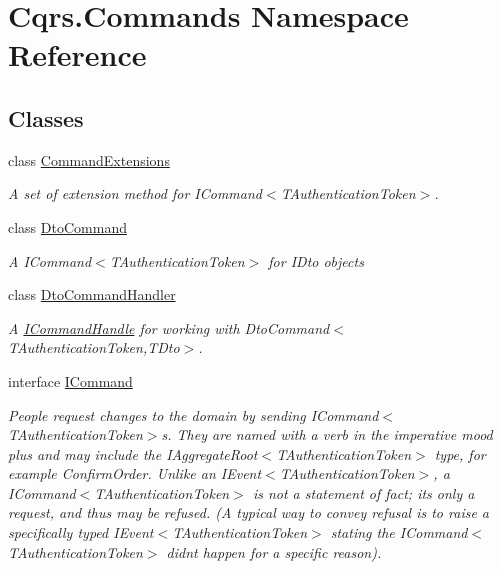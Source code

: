 \hypertarget{namespaceCqrs_1_1Commands}{}\section{Cqrs.\+Commands Namespace Reference}
\label{namespaceCqrs_1_1Commands}
\subsection*{Classes}
\begin{DoxyCompactItemize}
\item 
class \hyperlink{classCqrs_1_1Commands_1_1CommandExtensions}{Command\+Extensions}
\begin{DoxyCompactList}\small\item\em A set of extension method for I\+Command$<$\+T\+Authentication\+Token$>$. \end{DoxyCompactList}\item 
class \hyperlink{classCqrs_1_1Commands_1_1DtoCommand}{Dto\+Command}
\begin{DoxyCompactList}\small\item\em A I\+Command$<$\+T\+Authentication\+Token$>$ for I\+Dto objects \end{DoxyCompactList}\item 
class \hyperlink{classCqrs_1_1Commands_1_1DtoCommandHandler}{Dto\+Command\+Handler}
\begin{DoxyCompactList}\small\item\em A \hyperlink{interfaceCqrs_1_1Commands_1_1ICommandHandle}{I\+Command\+Handle} for working with Dto\+Command$<$\+T\+Authentication\+Token,\+T\+Dto$>$. \end{DoxyCompactList}\item 
interface \hyperlink{interfaceCqrs_1_1Commands_1_1ICommand}{I\+Command}
\begin{DoxyCompactList}\small\item\em People request changes to the domain by sending I\+Command$<$\+T\+Authentication\+Token$>$s. They are named with a verb in the imperative mood plus and may include the I\+Aggregate\+Root$<$\+T\+Authentication\+Token$>$ type, for example Confirm\+Order. Unlike an I\+Event$<$\+T\+Authentication\+Token$>$, a I\+Command$<$\+T\+Authentication\+Token$>$ is not a statement of fact; it\textquotesingle{}s only a request, and thus may be refused. (A typical way to convey refusal is to raise a specifically typed I\+Event$<$\+T\+Authentication\+Token$>$ stating the I\+Command$<$\+T\+Authentication\+Token$>$ didn\textquotesingle{}t happen for a specific reason). \end{DoxyCompactList}\item 

\end{DoxyCompactItemize}

